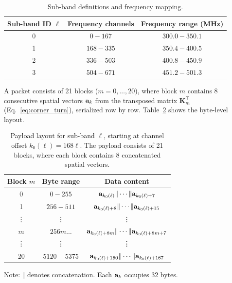 \begin{table}[t]
	\centering
	\caption{Sub-band definitions and frequency mapping.}
	\label{tab:subbands}
	\renewcommand{\arraystretch}{1.2}
	\begin{tabular}{@{}c c c@{}} 
		\toprule
		\textbf{Sub-band ID $\ell$} & \textbf{Frequency channels} & \textbf{Frequency range (\unit{\mega\hertz})} \\
		\midrule
		0 & $0   - 167$ & $300.0 - 350.1$ \\
		1 & $168 - 335$ & $350.4 - 400.5$ \\
		2 & $336 - 503$ & $400.8 - 450.9$ \\
		3 & $504 - 671$ & $451.2 - 501.3$ \\
		\bottomrule
	\end{tabular}
\end{table}

A packet consists of 21 blocks ($m=0,\dots,20$), where block $m$ contains 8 consecutive spatial vectors $\mathbf{a}_{k}$ from the transposed matrix $\mathbf{K}_m^\top$ (Eq.\ \ref{eq:corner_turn}), serialized row by row. Table~\ref{tab:packet_structure} shows the byte-level layout.

\begin{table}[t]
    \centering
    \caption[Data layout for sub-band $\ell$]{Payload layout for sub-band $\ell$, starting at channel offset $k_0(\ell)=168\ell$. The payload consists of 21 blocks, where each block contains 8 concatenated spatial vectors.}
    \label{tab:packet_structure}
    \small
    \renewcommand{\arraystretch}{1.3}
    \setlength{\tabcolsep}{6pt}
    \begin{tabular}{ccc}
    \toprule
    \textbf{Block $m$} & \textbf{Byte range} & \textbf{Data content} \\
    \midrule
    0 & $0 - 255$ & 
    $\mathbf{a}_{k_0(\ell)}  \Vert \cdots \Vert \mathbf{a}_{k_0(\ell)+7}$ \\
    1 & $256 - 511$ & 
    $\mathbf{a}_{k_0(\ell)+8} \Vert \cdots \Vert \mathbf{a}_{k_0(\ell)+15}$ \\
    \midrule
    \vdots & \vdots & \vdots \\
    \midrule
    $m$ & $256m \dots$ & 
    $\mathbf{a}_{k_0(\ell)+8m} \Vert \cdots \Vert \mathbf{a}_{k_0(\ell)+8m+7}$ \\
    \midrule
    \vdots & \vdots & \vdots \\
    \midrule
    20 & $5120 - 5375$ & 
    $\mathbf{a}_{k_0(\ell)+160} \Vert \cdots \Vert \mathbf{a}_{k_0(\ell)+167}$ \\
    \bottomrule
    \end{tabular}
    \vspace{0.3cm}
    
    \footnotesize{Note: $\Vert$ denotes concatenation. Each $\mathbf{a}_{k}$ occupies 32 bytes.}
\end{table}

